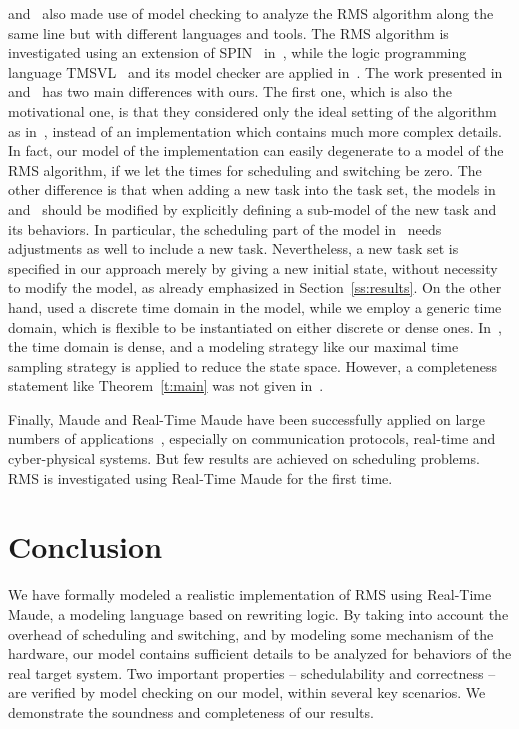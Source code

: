 \documentclass[journal]{IEEEtranTIE}
\begin{document}
\cite{TianD2011} and~\cite{DBLP:conf/iceccs/CuiDT14} also made use of
model checking to analyze the RMS algorithm along the same line but
with different languages and tools. The RMS algorithm is investigated
using an extension of SPIN~\cite{DBLP:journals/tse/Holzmann97}
in~\cite{TianD2011}, while the logic programming language
TMSVL~\cite{DBLP:conf/icfem/HanDW12} and its model checker are applied
in~\cite{DBLP:conf/iceccs/CuiDT14}. The work presented
in~\cite{TianD2011} and~\cite{DBLP:conf/iceccs/CuiDT14} has two main
differences with ours. The first one, which is also the motivational
one, is that they considered only the ideal setting of the algorithm
as in~\cite{DBLP:journals/jacm/LiuL73}, instead of an implementation
which contains much more complex details. In fact, our model of the
implementation can easily degenerate to a model of the RMS algorithm,
if we let the times for scheduling and switching be zero. The other
difference is that when adding a new task into the task set, the
models in~\cite{TianD2011} and~\cite{DBLP:conf/iceccs/CuiDT14} should
be modified by explicitly defining a sub-model of the new task and its
behaviors. In particular, the scheduling part of the model
in~\cite{TianD2011} needs adjustments as well to include a new
task. Nevertheless, a new task set is specified in our approach merely
by giving a new initial state, without necessity to modify the model,
as already emphasized in Section~\ref{ss:results}. On the other hand,
\cite{TianD2011} used a discrete time domain in the model, while we
employ a generic time domain, which is flexible to be instantiated on
either discrete or dense ones. In~\cite{DBLP:conf/iceccs/CuiDT14}, the
time domain is dense, and a modeling strategy like our maximal time
sampling strategy is applied to reduce the state space. However, a
completeness statement like Theorem~\ref{t:main} was not given
in~\cite{DBLP:conf/iceccs/CuiDT14}.

Finally, Maude and Real-Time Maude have been successfully applied on
large numbers of applications~\cite{DBLP:journals/jlp/Meseguer12},
especially on communication protocols, real-time and cyber-physical
systems. But few results are achieved on scheduling problems. RMS is
investigated using Real-Time Maude for the first time.


\section{Conclusion}
\label{s:conclusion}
We have formally modeled a realistic implementation of RMS using
Real-Time Maude, a modeling language based on rewriting logic. By
taking into account the overhead of scheduling and switching, and by
modeling some mechanism of the hardware, our model contains sufficient
details to be analyzed for behaviors of the real target
system. Two important properties -- schedulability and correctness --
are verified by model checking on our model, within several key
scenarios. We demonstrate the soundness and completeness of our
results.
\end{document}
